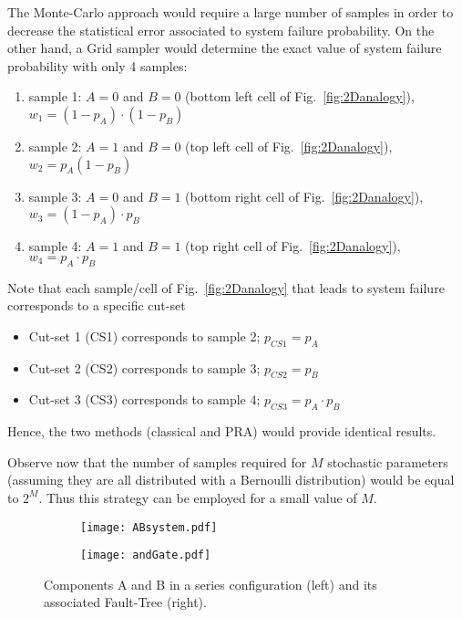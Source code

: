 The Monte-Carlo approach would require a large number of samples in order to decrease the statistical error associated
to system failure probability.
On the other hand, a Grid sampler would determine the exact value of system failure probability with only 4 samples:
\begin{enumerate}
  \item sample 1: $A=0$ and $B=0$ (bottom left cell of Fig.~\ref{fig:2Danalogy}), $w_1 = (1-p_A) \cdot (1-p_B)$
  \item sample 2: $A=1$ and $B=0$ (top left cell of Fig.~\ref{fig:2Danalogy}), $w_2 = p_A (1-p_B)$
  \item sample 3: $A=0$ and $B=1$ (bottom right cell of Fig.~\ref{fig:2Danalogy}), $w_3 = (1-p_A) \cdot p_B$
  \item sample 4: $A=1$ and $B=1$ (top right cell of Fig.~\ref{fig:2Danalogy}), $w_4 = p_A \cdot p_B$
\end{enumerate}
Note that each sample/cell of Fig.~\ref{fig:2Danalogy} that leads to system failure corresponds to a specific cut-set
\begin{itemize}
  \item Cut-set 1 (CS1) corresponds to sample 2; $p_{CS1} = p_A$
  \item Cut-set 2 (CS2) corresponds to sample 3; $p_{CS2} = p_B$
  \item Cut-set 3 (CS3) corresponds to sample 4; $p_{CS3} = p_A \cdot p_B$
\end{itemize}
Hence, the two methods (classical and PRA) would provide identical results.

Observe now that the number of samples required for $M$ stochastic parameters (assuming they are all distributed with 
a Bernoulli distribution) would be equal to $2^M$. Thus this strategy can be employed for a small value of $M$.

\begin{figure}
  \centering
  \begin{subfigure}{.5\textwidth}
    \centering
    \texttt{[image: ABsystem.pdf]}
    \label{fig:sub1}
  \end{subfigure}%
  \begin{subfigure}{.5\textwidth}
    \centering
    \texttt{[image: andGate.pdf]}
    \label{fig:andGate}
  \end{subfigure}
  \caption{Components A and B in a series configuration (left) and its associated Fault-Tree (right).}
  \label{fig:ABsystem}
\end{figure}

